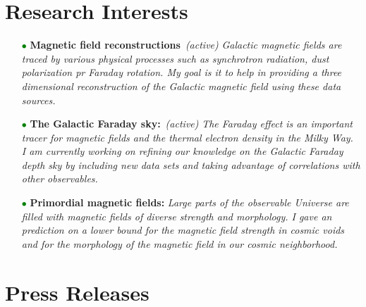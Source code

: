 \documentclass[11pt,a4paper,sans, table, dvipsnames]{moderncv}        %
\begin{document}
\section{Research Interests}
\begin{itemize}

\item[\textcolor{Green}{$\bullet$}]{\textbf{Magnetic field reconstructions} \,\textit{(active)} \newline \textit{Galactic magnetic fields are traced by various physical processes such as synchrotron radiation, dust polarization pr Faraday rotation. My goal is it to help in providing a three dimensional reconstruction of the Galactic magnetic field using these data sources. }}

\vspace{3pt}

\item[\textcolor{Green}{$\bullet$}]{\textbf{The Galactic Faraday sky:} \,\textit{(active)}  \newline \textit{The Faraday effect is an important tracer for magnetic fields and the thermal electron density in the Milky Way. I am currently working on refining our knowledge on the Galactic Faraday depth sky by including new data sets and taking advantage of correlations with other observables.}}

\vspace{3pt}

\item[\textcolor{Green}{$\bullet$}]{\textbf{Primordial magnetic fields:}  \newline \textit{Large parts of the observable Universe are filled with magnetic fields of diverse strength and morphology. I gave an prediction on a lower bound for the magnetic field strength in cosmic voids and for the morphology of the magnetic field in our cosmic neighborhood. }}
\end{itemize}


\section{Press Releases}
\end{document}
